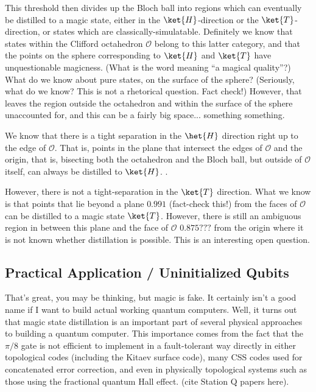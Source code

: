 This threshold then divides up the Bloch ball into regions which can eventually
be distilled to a magic state, either in the $\ket{H}$-direction or the
$\ket{T}$-direction, or states which are classically-simulatable. Definitely
we know that states within the Clifford octahedron $\mathcal{O}$ belong to this
latter category, and that the points on the sphere corresponding to
$\ket{H}$ and $\ket{T}$ have unquestionable magicness. (What is the word meaning
``a magical quality''?) What do we know about pure states, on the surface
of the sphere? (Seriously, what do we know? This is not a rhetorical question.
Fact check!) However, that leaves the region outside the octahedron and within
the surface of the sphere unaccounted for, and this can be a fairly big space...
something something.

We know that there is a tight separation in the $\het{H}$ direction right up
to the edge of $\mathcal{O}$. That is, points in the plane that intersect
the edges of $\mathcal{O}$ and the origin, that is, bisecting both the
octahedron and the Bloch ball, but outside of $\mathcal{O}$ itself, can always
be distilled to $\ket{H}$. \cite{Bravyi2002}.

However, there is not a tight-separation in the $\ket{T}$ direction. What we
know is that points that lie beyond a plane $0.991$ (fact-check this!) from
the faces of $\mathcal{O}$ can be distilled to a magic state $\ket{T}$.
However, there is still an ambiguous region in between this plane and the
face of $\mathcal{O}$ $0.875???$ from the origin where it is not known
whether distillation is possible. This is an interesting open question.

\subsection{Practical Application / Uninitialized Qubits}

That's great, you may be thinking, but magic is fake. It certainly isn't a good
name if I want to build actual working quantum computers. Well, it turns out
that magic state distillation is an important part of several physical approaches
to building a quantum computer. This importance comes from the fact that the
$\pi/8$ gate is not efficient to implement in a fault-tolerant way directly
in either topological codes (including the Kitaev surface code), many CSS
codes used for concatenated error correction, and even in physically
topological systems such as those using the fractional quantum Hall effect.
(cite Station Q papers here).

